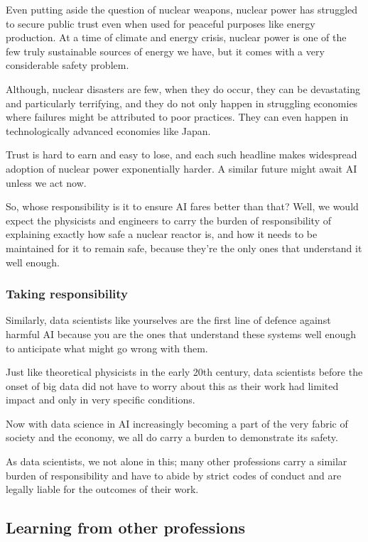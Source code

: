 \documentclass[
]{book}
\theoremstyle{definition}
\theoremstyle{definition}
\theoremstyle{definition}
\theoremstyle{definition}
\theoremstyle{remark}
\begin{document}
Even putting aside the question of nuclear weapons, nuclear power has struggled to secure public trust even when used for peaceful purposes like energy production. At a time of climate and energy crisis, nuclear power is one of the few truly sustainable sources of energy we have, but it comes with a very considerable safety problem.

Although, nuclear disasters are few, when they do occur, they can be
devastating and particularly terrifying, and they do not only happen
in struggling economies where failures might be attributed to poor practices.
They can even happen in technologically advanced economies like Japan.

Trust is hard to earn and easy to lose, and each such headline makes
widespread adoption of nuclear power exponentially harder. A similar future might await AI unless we act now.

So, whose responsibility is it to ensure AI fares better than that? Well, we would expect the physicists and engineers to carry the burden of responsibility of explaining exactly how safe a nuclear reactor is, and how it needs to be maintained for it to remain safe, because they're the only
ones that understand it well enough.

\hypertarget{taking-responsibility}{%
\subsubsection{Taking responsibility}\label{taking-responsibility}}

Similarly, data scientists like yourselves are the first line of defence against harmful AI because you are the ones that understand these systems well enough to anticipate what might go wrong with them.

Just like theoretical physicists in the early 20th century, data scientists before the onset of big data did not have to worry about this as their work had limited impact and only in very specific conditions.

Now with data science in AI increasingly becoming a part of the very fabric of society and the economy, we all do carry a burden to demonstrate its safety.

As data scientists, we not alone in this; many other professions carry a similar burden of responsibility and have to abide by strict codes of conduct and are legally liable for the outcomes of their work.

\hypertarget{learning-from-other-professions}{%
\subsection{Learning from other professions}\label{learning-from-other-professions}}
\end{document}
